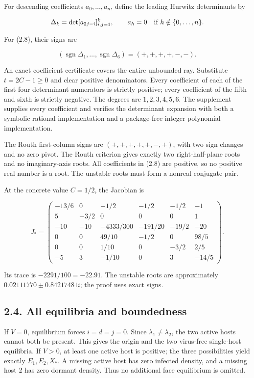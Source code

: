 \documentclass[
  11pt,
]{article}
\begin{document}
For descending coefficients \(a_0,\ldots,a_n\), define the leading
Hurwitz determinants by

\[
\Delta_k=\det[a_{2j-i}]_{i,j=1}^k,\qquad
a_h=0\quad\hbox{if }h\notin\{0,\ldots,n\}.
\]

For (2.8), their signs are

\[
(\operatorname{sgn}\Delta_1,\ldots,\operatorname{sgn}\Delta_6)
=(+,+,+,+,-,-). \tag{2.9}
\]

An exact coefficient certificate covers the entire unbounded ray.
Substitute \(t=2C-1\geq0\) and clear positive denominators. Every
coefficient of each of the first four determinant numerators is strictly
positive; every coefficient of the fifth and sixth is strictly negative.
The degrees are \(1,2,3,4,5,6\). The supplement supplies every
coefficient and verifies the determinant expansion with both a symbolic
rational implementation and a package-free integer polynomial
implementation.

The Routh first-column signs are \((+,+,+,+,+,-,+)\), with two sign
changes and no zero pivot. The Routh criterion gives exactly two
right-half-plane roots and no imaginary-axis roots. All coefficients in
(2.8) are positive, so no positive real number is a root. The unstable
roots must form a nonreal conjugate pair.

At the concrete value \(C=1/2\), the Jacobian is

\[
J_*=
\begin{pmatrix}
-13/6&0&-1/2&-1/2&-1/2&-1\\
5&-3/2&0&0&0&1\\
-10&-10&-4333/300&-191/20&-19/2&-20\\
0&0&49/10&-1/2&0&98/5\\
0&0&1/10&0&-3/2&2/5\\
-5&3&-1/10&0&3&-14/5
\end{pmatrix}. \tag{2.10}
\]

Its trace is \(-2291/100=-22.91\). The unstable roots are approximately
\(0.02111770\pm0.84217481i\); the proof uses exact signs.

\subsection{2.4. All equilibria and
boundedness}\label{all-equilibria-and-boundedness}

If \(V=0\), equilibrium forces \(i=d=j=0\). Since
\(\lambda_1\ne\lambda_2\), the two active hosts cannot both be present.
This gives the origin and the two virus-free single-host equilibria. If
\(V>0\), at least one active host is positive; the three possibilities
yield exactly \(E_1,E_2,X_*\). A missing active host has zero infected
density, and a missing host 2 has zero dormant density. Thus no
additional face equilibrium is omitted.
\end{document}
